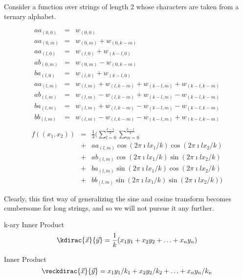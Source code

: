 Consider a function over strings of length 2 whose characters are taken
from a ternary alphabet.

\begin{eqnarray}
aa_{(0,0)} &=& w_{(0,0)} \nonumber \\
aa_{(0,m)} &=& w_{(0,m)} + w_{(0,k-m)} \nonumber \\
aa_{(l,0)} &=& w_{(l,0)} + w_{(k-l,0)} \nonumber \\
ab_{(0,m)} &=& w_{(0,m)} - w_{(0,k-m)} \nonumber \\
ba_{(l,0)} &=& w_{(l,0)} + w_{(k-l,0)} \nonumber \\
aa_{(l,m)} &=& w_(l,m) + w_(l,k-m) + w_(k-l,m) + w_(k-l,k-m) \nonumber \\
ab_{(l,m)} &=& w_(l,m) - w_(l,k-m) + w_(k-l,m) - w_(k-l,k-m) \nonumber \\
ba_{(l,m)} &=& w_(l,m) + w_(l,k-m) - w_(k-l,m) - w_(k-l,k-m) \nonumber \\
bb_{(l,m)} &=& w_(l,m) - w_(l,k-m) - w_(k-l,m) + w_(k-l,k-m) \nonumber \\
\end{eqnarray}
\begin{eqnarray}
f((x_1,x_2))  &=& \frac{1}{3}( \sum_{l=0}^{\frac{k-1}{2}} {
        \sum_{m=0}^{\frac{k-1}{2}} {}}\nonumber \\
&+& aa_{(l,m)} \cos(2 \pi \imath l x_1/k) \cos(2 \pi \imath l x_2/k)\nonumber \\
&+& ab_{(l,m)} \cos(2 \pi \imath l x_1/k) \sin(2 \pi \imath l x_2/k)\nonumber\\
&+& ba_{(l,m)} \sin(2 \pi \imath l x_1/k) \cos(2 \pi \imath l x_2/k)\nonumber\\
&+& bb_{(l,m)} \sin(2 \pi \imath l x_1/k) \sin(2 \pi \imath l x_2/k)
)
\end{eqnarray}

Clearly, this first way of generalizing the sine and cosine transform becomes
cumbersome for long strings, and so we will not pursue it any further.


\begin{definition}{k-ary Inner Product}
\begin{equation}
\kdirac{\vec x}{\vec y}=\frac{1}{k}(x_1 y_1+x_2 y_2+\ldots+x_n y_n)
\end{equation}
\end{definition}
\begin{definition}{\veckary Inner Product}
\begin{equation}
\veckdirac{\vec x}{\vec y}=x_1 y_1/k_1+x_2 y_2/k_2+\ldots+x_n y_n/k_n
\end{equation}
\end{definition}



